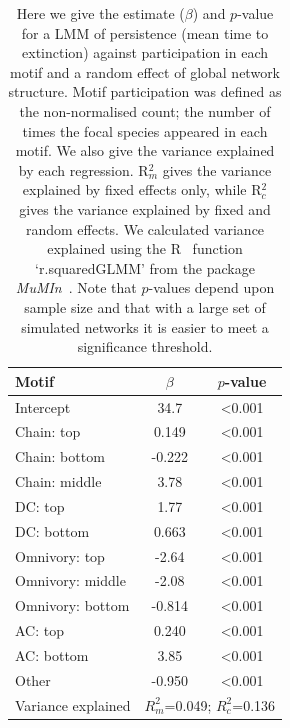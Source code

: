 \documentclass[12pt]{article}
\begin{document}
		\begin{table}[hb!]
    		\caption{Here we give the estimate ($\beta$) and $p$-value for a LMM of persistence (mean time to extinction) against participation in each motif and a random effect of global network structure. Motif participation was defined as the non-normalised count; the number of times the focal species appeared in each motif. We also give the variance explained by each regression. R$^{2}_{m}$ gives the variance explained by fixed effects only, while R$^{2}_{c}$ gives the variance explained by fixed and random effects. We calculated variance explained using the R~\citep{R} function `r.squaredGLMM' from the package \emph{MuMIn}~\citep{MuMIn}. Note that $p$-values depend upon sample size and that with a large set of simulated networks it is easier to meet a significance threshold.}
    		\label{tab:Z_positions}
    		\begin{tabular}{l | c c}
    		Motif & $\beta$ & $p$-value \\  
    		\hline
            Intercept	&	34.7	&	\textless0.001	\\
            Chain: top	&	0.149	&	\textless0.001	\\
            Chain: bottom	&	-0.222	&	\textless0.001	\\
            Chain: middle	&	3.78	&	\textless0.001	\\
            DC: top	&	1.77	&	\textless0.001	\\
            DC: bottom	&	0.663	&	\textless0.001	\\
            Omnivory: top	&	-2.64	&	\textless0.001	\\
            Omnivory: middle	&	-2.08	&	\textless0.001	\\
            Omnivory: bottom	&	-0.814	&	\textless0.001	\\
            AC: top	&	0.240	&	\textless0.001	\\
            AC: bottom	&	3.85	&	\textless0.001	\\
            Other	&	-0.950	&	\textless0.001	\\
            \hline
    		Variance explained & \multicolumn{2}{c}{$R^{2}_m$=0.049; $R^2_c$=0.136} \\
    		\hline
    		\end{tabular}
    		\end{table}
\end{document}
